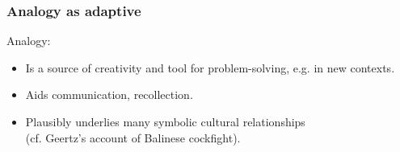 \documentclass[12pt,xcolor=svgnames]{beamer}
\makeatletter
\newcommand{\eg}{e.g.\@\xspace}
\let\olditem\item
\renewcommand{\item}{%
\olditem\vspace{0.5pt}}
\makeatother
\begin{document}


\begin{frame}\frametitle{Analogy as adaptive}
Analogy:
\begin{itemize}
\item Is a source of creativity and tool for problem-solving,
\eg in new contexts.
\item Aids communication, recollection.\\
\item Plausibly underlies many symbolic cultural relationships\\
{\tiny (cf. Geertz's account of Balinese cockfight).}
\end{itemize}
\end{frame}
\end{document}
